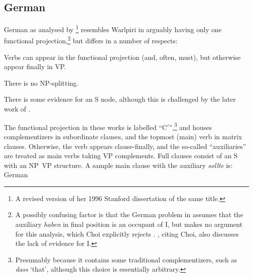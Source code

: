 \documentclass[output=paper,hidelinks]{langscibook}
\begin{document}
\subsection{German}\label{german}
%
%
German as analysed by \citet{Choi1999}\footnote
 {A revised version of her 1996 Stanford dissertation of the same title.}
resembles Warlpiri in arguably having only one functional projection,\footnote
 {A possibly confusing factor is that the German problem in \citet[375-379]
  {BresnanEtAl2016} assumes that the auxiliary {\it haben} in final position is an
  occupant of I, but makes no argument for this analysis, which Choi explicitly
  rejects \citep[33]{Choi1999}.  \citet[31-32]{Berman2003}, citing Choi, also discusses the lack of
  evidence for I.}
but differs in a number of respects:
\ea
\begin{xlist}
\item Verbs can appear in the functional projection (and, often, must), but otherwise
appear finally in VP.
\item There is no NP-splitting.
\item There is some evidence for an S node, although this is challenged by the later work
of \citet{Berman2003}.
\end{xlist}
\z
The functional projection in these works is labelled ``C$'$'',\footnote
  {Presumably because it contains some traditional complementizers, such
  as {\it dass} `that', although this choice is essentially arbitrary.}
and houses complementizers in subordinate
clauses, and the topmost (main) verb in matrix clauses.  Otherwise, the verb appears
clause-finally, and the so-called ``auxiliaries'' are treated as main verbs taking
VP complements. Full clauses consist of an S with an NP~VP structure.  A sample
main clause with the auxiliary {\it sollte} is:
\ea\label{germanmain}
German
\end{document}
